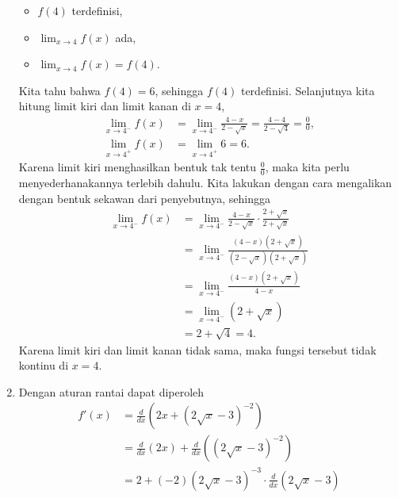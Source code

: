 \documentclass[11pt,openany,a4paper]{article}
\begin{document}
\begin{enumerate}
          \begin{itemize}
              \item $f(4)$ terdefinisi,
              \item $\lim_{x \to 4} f(x)$ ada,
              \item $\lim_{x \to 4} f(x) = f(4)$.
          \end{itemize}
          Kita tahu bahwa $f(4)=6$, sehingga $f(4)$ terdefinisi. Selanjutnya kita hitung limit kiri dan limit kanan di $x=4$,
          \begin{align*}
              \lim_{x \to 4^-} f(x) & = \lim_{x \to 4^-} \frac{4 - x}{2 - \sqrt{x}} = \frac{4 - 4}{2 - \sqrt{4}} = \frac{0}{0}, \\
              \lim_{x \to 4^+} f(x) & = \lim_{x \to 4^+} 6 = 6.
          \end{align*}
          Karena limit kiri menghasilkan bentuk tak tentu $\frac{0}{0}$, maka kita perlu menyederhanakannya terlebih dahulu. Kita lakukan dengan cara mengalikan dengan bentuk sekawan dari penyebutnya, sehingga
          \begin{align*}
              \lim_{x \to 4^-} f(x) & = \lim_{x \to 4^-} \frac{4 - x}{2 - \sqrt{x}} \cdot \frac{2 + \sqrt{x}}{2 + \sqrt{x}}      \\
                                    & = \lim_{x \to 4^-} \frac{(4 - x)(2 + \sqrt{x})}{(2 - \sqrt{x})(2 + \sqrt{x})}              \\
                                    & = \lim_{x \to 4^-} \frac{(4 - x)(2 + \sqrt{x})}{4 - x}                                     \\
                                    & = \lim_{x \to 4^-} (2 + \sqrt{x})                                                          \\
                                    & = 2 + \sqrt{4}                                                                        = 4.
          \end{align*}
          Karena limit kiri dan limit kanan tidak sama, maka fungsi tersebut tidak kontinu di $x=4$.
    \item Dengan aturan rantai dapat diperoleh
          \begin{align*}
              f'(x) & = \frac{d}{dx}\left(2x+(2\sqrt{x} - 3)^{-2}\right)                           \\
                    & =\frac{d}{dx}(2x)+\frac{d}{dx}((2\sqrt{x} - 3)^{-2})                         \\
                    & =2 + (-2)(2\sqrt{x} - 3)^{-3} \cdot \frac{d}{dx}(2\sqrt{x} - 3)              \\

\end{align*}
\end{enumerate}
\end{document}
